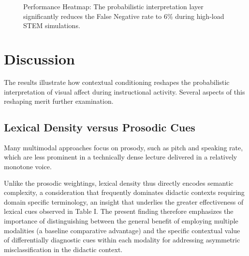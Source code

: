 \documentclass[conference]{IEEEtran}
\begin{document}
\begin{figure}[htbp]
\centering
{}
\caption{Performance Heatmap: The probabilistic interpretation layer significantly reduces the False Negative rate to 6\% during high-load STEM simulations.}
\label{fig:confusion}
\end{figure}

\section{Discussion}

The results illustrate how contextual conditioning reshapes the probabilistic interpretation of visual affect during instructional activity. Several aspects of this reshaping merit further examination.

\subsection{Lexical Density versus Prosodic Cues}
Many multimodal approaches focus on prosody, such as pitch and speaking rate, \cite{b9} which are less prominent in a technically dense lecture delivered in a relatively monotone voice.

Unlike the prosodic weightings, lexical density thus directly encodes semantic complexity, a consideration that frequently dominates didactic contexts requiring domain specific terminology, an insight that underlies the greater effectiveness of lexical cues observed in Table I. The present finding therefore emphasizes the importance of distinguishing between the general benefit of employing multiple modalities (a baseline comparative advantage) and the specific contextual value of differentially diagnostic cues within each modality for addressing asymmetric misclassification in the didactic context.
\end{document}
